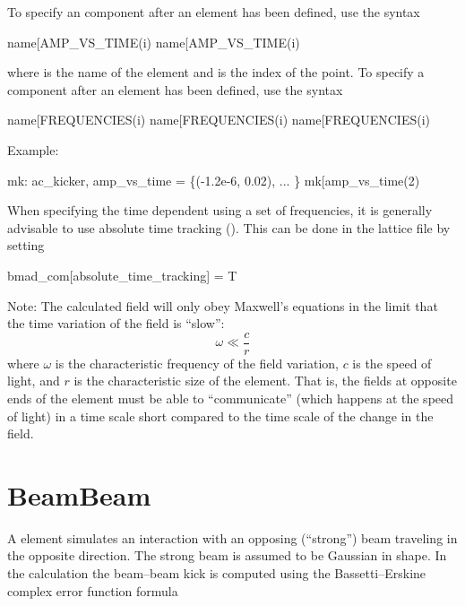 To specify an  component after an  element has been defined, use the
syntax
\begin{example}
  name[AMP_VS_TIME(i)%
  name[AMP_VS_TIME(i)%
\end{example}
where  is the name of the element and  is the index of the point.
To specify a  component after an  element has been defined, use the
syntax
\begin{example}
  name[FREQUENCIES(i)%
  name[FREQUENCIES(i)%
  name[FREQUENCIES(i)%
\end{example}
Example:
\begin{example}
  mk: ac_kicker, amp_vs_time = \{(-1.2e-6, 0.02), ... \} 
  mk[amp_vs_time(2)%
\end{example}

When specifying the time dependent using a set of frequencies, it is generally advisable to use
absolute time tracking (). This can be done in the lattice file by setting
\begin{example}
  bmad_com[absolute_time_tracking] = T
\end{example}

Note: The calculated field will only obey Maxwell's equations in the limit that the time variation
of the field is ``slow'':
\begin{equation}
  \omega \ll \frac{c}{r}
\end{equation}
where $\omega$ is the characteristic frequency of the field variation, $c$ is the speed of light,
and $r$ is the characteristic size of the  element. That is, the fields at opposite
ends of the element must be able to ``communicate'' (which happens at the speed of light) in a time
scale short compared to the time scale of the change in the field.

\newpage

\section{BeamBeam}
\label{s:beambeam}

A  element simulates an interaction with an opposing
(``strong'') beam traveling in the opposite direction. The strong beam
is assumed to be Gaussian in shape. In the 
calculation the beam--beam kick is computed using the
Bassetti--Erskine complex error function formula\cite{b:talman}

